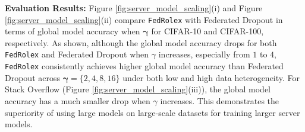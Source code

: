 \documentclass{article}
\begin{document}
%
\textbf{Evaluation Results:} Figure \ref{fig:server_model_scaling}(i) and Figure \ref{fig:server_model_scaling}(ii) compare \texttt{FedRolex} with Federated Dropout in terms of global model accuracy when $\boldsymbol\gamma$ for CIFAR-10 and CIFAR-100, respectively.
%
As shown, although the global model accuracy drops for both \texttt{FedRolex} and Federated Dropout when $\gamma$ increases, especially from $1$ to $4$, \texttt{FedRolex} consistently achieves higher global model accuracy than Federated Dropout across $\boldsymbol\gamma = \{2, 4, 8, 16\}$ under both low and high data heterogeneity.
%
For Stack Overflow (Figure \ref{fig:server_model_scaling}(iii)), the global model accuracy has a much smaller drop  when $\gamma$ increases. This demonstrates the superiority of using large models on large-scale datasets for training larger server models.

\end{document}

